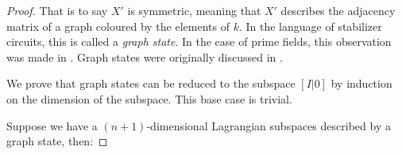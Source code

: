 \begin{proof}
That is to say $X'$ is symmetric, meaning that $X'$ describes the adjacency matrix of a graph coloured by the elements of $k$.
In the language of stabilizer circuits, this is called a {\em graph state}.  In the case of prime fields, this observation was made in \cite[Eq. 18]{gross}.  Graph states were originally discussed in \cite{hein2006entanglement}.


%
%
%
%
%


We prove that graph states can be reduced to the subspace $[I|0]$ by induction on the dimension of the subspace.
This base case is trivial.

Suppose we have a $(n+1)$-dimensional Lagrangian subspaces described by a graph state, then:
\newpage


\end{proof}
